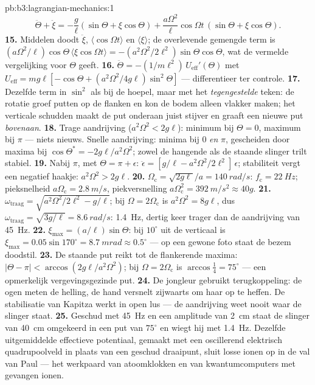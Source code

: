 \begin{solution}{pb:b3:lagrangian-mechanics:1}
\[
\ddot\Theta + \ddot\xi = -\frac{g}{\ell}(\sin\Theta + \xi\cos\Theta)
 + \frac{a\Omega^2}{\ell}\cos\Omega t\,(\sin\Theta + \xi\cos\Theta) .
\]
\textbf{15.} Middelen doodt $\ddot\xi$, $\langle\cos\Omega t\rangle$ en
$\langle\xi\rangle$; de overlevende gemengde term is
$(a\Omega^2/\ell)\cos\Theta\,\langle\xi\cos\Omega t\rangle =
-(a^2\Omega^2/2\ell^2)\sin\Theta\cos\Theta$, wat de vermelde
vergelijking voor $\Theta$ geeft.
\textbf{16.} $\ddot\Theta = -(1/m\ell^2)\,U_{\text{eff}}'(\Theta)$ met
$U_{\text{eff}} = mg\ell[-\cos\Theta + (a^2\Omega^2/4g\ell)
\sin^2\Theta]$ --- differentieer ter controle.
\textbf{17.} Dezelfde term in $\sin^2$ als bij de hoepel, maar met het
\emph{tegengestelde} teken: de rotatie groef putten op de flanken en kon
de bodem alleen vlakker maken; het verticale schudden maakt de put
onderaan juist stijver en graaft een nieuwe put \emph{bovenaan}.
\textbf{18.} Trage aandrijving ($a^2\Omega^2 < 2g\ell$): minimum bij
$\Theta =
0$, maximum bij $\pi$ --- niets nieuws. Snelle aandrijving:
minima bij $0$ \emph{en} $\pi$, gescheiden door maxima bij
$\cos\Theta^* =
-2g\ell/a^2\Omega^2$; zowel de hangende als de staande
slinger trilt stabiel.
\textbf{19.} Nabij $\pi$, met $\Theta = \pi + \epsilon$:
$\ddot\epsilon = [g/\ell - a^2\Omega^2/2\ell^2]\,\epsilon$; stabiliteit
vergt een negatief haakje: $a^2\Omega^2 > 2g\ell$.
\textbf{20.} $\Omega_{\text{c}} = \sqrt{2g\ell}/a = \qty{140}{rad/s}$:
$f_{\text{c}} = \qty{22}{Hz}$; pieksnelheid $a\Omega_{\text{c}} =
\qty{2.8}{m/s}$, piekversnelling $a\Omega_{\text{c}}^2 =
\qty{392}{m/s^2} \approx 40g$.
\textbf{21.} $\omega_{\text{traag}} = \sqrt{a^2\Omega^2/2\ell^2 -
g/\ell}$; bij $\Omega = 2\Omega_{\text{c}}$ is $a^2\Omega^2 = 8g\ell$,
dus $\omega_{\text{traag}} = \sqrt{3g/\ell} = \qty{8.6}{rad/s}$:
\qty{1.4}{Hz}, dertig keer trager dan de aandrijving van \qty{45}{Hz}.
\textbf{22.} $\xi_{\max} = (a/\ell)\sin\Theta$: bij $10^\circ$ uit de
verticaal is $\xi_{\max} = 0.05\sin170^\circ = \qty{8.7}{mrad}
\approx 0.5^\circ$ --- op een gewone foto staat de bezem doodstil.
\textbf{23.} De staande put reikt tot de flankerende maxima:
$|\Theta - \pi| < \arccos(2g\ell/a^2\Omega^2)$; bij $\Omega =
2\Omega_{\text{c}}$ is $\arccos\tfrac14 = 75^\circ$ --- een opmerkelijk
vergevingsgezinde put.
\textbf{24.} De jongleur gebruikt terugkoppeling: de ogen meten de
helling, de hand versnelt zijwaarts om haar op te heffen. De
stabilisatie van Kapitza werkt in open lus --- de aandrijving weet nooit
waar de slinger staat.
\textbf{25.} Geschud met \qty{45}{Hz} en een amplitude van \qty{2}{cm}
staat de slinger van \qty{40}{cm} omgekeerd in een put van $75^\circ$ en
wiegt hij met \qty{1.4}{Hz}. Dezelfde uitgemiddelde effectieve
potentiaal, gemaakt met een oscillerend elektrisch quadrupoolveld in
plaats van een geschud draaipunt, sluit losse ionen op in de val van
Paul --- het werkpaard van atoomklokken en van kwantumcomputers met
gevangen ionen.
\end{solution}
